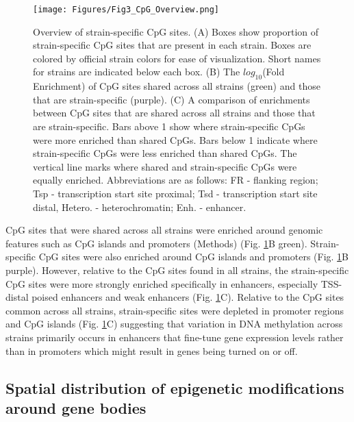 \documentclass[
  11pt,
]{article}
\begin{document}
\begin{figure}[ht!]
\begin{minipage}[c]{0.4\textwidth}
  \texttt{[image: Figures/Fig3\_CpG\_Overview.png]} 
\end{minipage}\hfill
\begin{minipage}[c]{0.5\textwidth}
\caption{Overview of strain-specific CpG sites. (A) Boxes 
show proportion of strain-specific CpG sites that are present 
in each strain. Boxes are colored by official strain colors
for ease of visualization. Short names for strains are
indicated below each box. (B) The $log_{10}$(Fold Enrichment)
of CpG sites shared across all strains (green) and those
that are strain-specific (purple). (C) A comparison
of enrichments between CpG sites that are shared across all 
strains and those that are strain-specific. Bars above 1
show where strain-specific CpGs were more enriched than 
shared CpGs. Bars below 1 indicate where strain-specific 
CpGs were less enriched than shared CpGs. The vertical 
line marks where shared and strain-specific CpGs were equally 
enriched. Abbreviations are as follows: FR - flanking region; 
Tsp - transcription start site proximal; Tsd - transcription
start site distal, Hetero. - heterochromatin; Enh. - enhancer.
}
\label{fig:cpg_overview}
\end{minipage}
\end{figure}

CpG sites that were shared across all strains were enriched around
genomic features such as CpG islands and promoters (Methods) (Fig.
\ref{fig:cpg_overview}B green). Strain-specific CpG sites were also
enriched around CpG islands and promoters (Fig. \ref{fig:cpg_overview}B
purple). However, relative to the CpG sites found in all strains, the
strain-specific CpG sites were more strongly enriched specifically in
enhancers, especially TSS-distal poised enhancers and weak enhancers
(Fig. \ref{fig:cpg_overview}C). Relative to the CpG sites common across
all strains, strain-specific sites were depleted in promoter regions and
CpG islands (Fig. \ref{fig:cpg_overview}C) suggesting that variation in
DNA methylation across strains primarily occurs in enhancers that
fine-tune gene expression levels rather than in promoters which might
result in genes being turned on or off.

\hypertarget{spatial-distribution-of-epigenetic-modifications-around-gene-bodies}{%
\subsection{Spatial distribution of epigenetic modifications around gene
bodies}\label{spatial-distribution-of-epigenetic-modifications-around-gene-bodies}}
\end{document}
